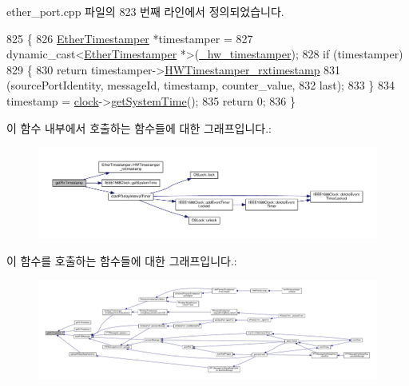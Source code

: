 ether\+\_\+port.\+cpp 파일의 823 번째 라인에서 정의되었습니다.


\begin{DoxyCode}
825 \{
826     \hyperlink{class_ether_timestamper}{EtherTimestamper} *timestamper =
827         \textcolor{keyword}{dynamic\_cast<}\hyperlink{class_ether_timestamper}{EtherTimestamper} *\textcolor{keyword}{>}(\hyperlink{class_common_port_a6b964d49ce26b21cc984b14102973f87}{\_hw\_timestamper});
828     \textcolor{keywordflow}{if} (timestamper)
829     \{
830         \textcolor{keywordflow}{return} timestamper->\hyperlink{class_ether_timestamper_afcc61feb25861ff20edbb657170a3c9e}{HWTimestamper\_rxtimestamp}
831             (sourcePortIdentity, messageId, timestamp, counter\_value,
832              last);
833     \}
834     timestamp = \hyperlink{class_common_port_aa2bc8731fa5aeb5b033feebc2b67258c}{clock}->\hyperlink{class_i_e_e_e1588_clock_a36929ce6b68ef7534184307e44f3796d}{getSystemTime}();
835     \textcolor{keywordflow}{return} 0;
836 \}
\end{DoxyCode}


이 함수 내부에서 호출하는 함수들에 대한 그래프입니다.\+:
\nopagebreak
\begin{figure}[H]
\begin{center}
\leavevmode
\includegraphics[width=350pt]{class_ether_port_a27ce3ecc12474bcac4e8a59cda91a953_cgraph}
\end{center}
\end{figure}




이 함수를 호출하는 함수들에 대한 그래프입니다.\+:
\nopagebreak
\begin{figure}[H]
\begin{center}
\leavevmode
\includegraphics[width=350pt]{class_ether_port_a27ce3ecc12474bcac4e8a59cda91a953_icgraph}
\end{center}
\end{figure}


